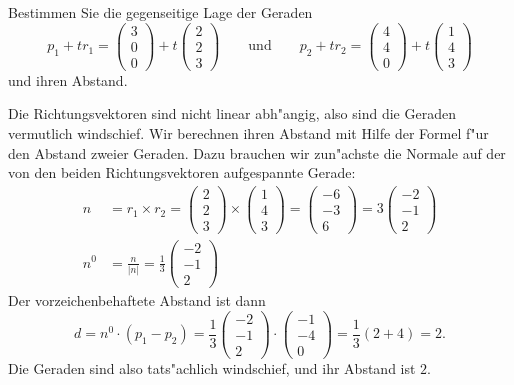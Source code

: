 Bestimmen Sie die gegenseitige Lage der Geraden
\[
p_1+tr_1
=
\begin{pmatrix} 3\\ 0\\ 0 \end{pmatrix}
+t
\begin{pmatrix} 2\\ 2\\ 3 \end{pmatrix}
\qquad
\text{und}
\qquad
p_2+tr_2
=
\begin{pmatrix} 4\\ 4\\ 0 \end{pmatrix}
+t
\begin{pmatrix} 1\\ 4\\ 3 \end{pmatrix}
\]
und ihren Abstand.

\begin{loesung}
Die Richtungsvektoren sind nicht linear abh"angig, also sind
die Geraden vermutlich windschief. Wir berechnen ihren Abstand mit
Hilfe der Formel f"ur den Abstand zweier Geraden. Dazu brauchen
wir zun"achste die Normale auf der von den beiden Richtungsvektoren
aufgespannte Gerade:
\begin{align*}
n&=r_1\times r_2 =\begin{pmatrix} 2\\ 2\\ 3 \end{pmatrix}
\times
\begin{pmatrix} 1\\ 4\\ 3 \end{pmatrix}
=
\begin{pmatrix} -6\\-3\\6 \end{pmatrix}
=3
\begin{pmatrix} -2\\-1\\2 \end{pmatrix}
\\
n^0&=\frac{n}{|n|}=
\frac13
\begin{pmatrix} -2\\-1\\2 \end{pmatrix}
\end{align*}
Der vorzeichenbehaftete Abstand ist dann
\[
d=n^0\cdot(p_1-p_2)=
\frac13
\begin{pmatrix} -2\\-1\\2 \end{pmatrix}
\cdot
\begin{pmatrix} -1\\-4\\0\end{pmatrix}
=\frac13(2+4)=2.
\]
Die Geraden sind also tats"achlich windschief, und
ihr Abstand ist $2$.
\end{loesung}

